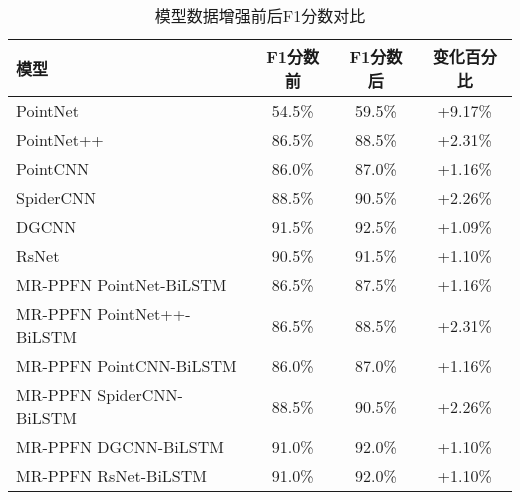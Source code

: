 \begin{table}[htbp]
    \begin{subtable}{\linewidth}
        \centering
        \caption{模型数据增强前后F1分数对比}
        \begin{tabular}{lccc}
            \toprule
            \textbf{模型} & \textbf{F1分数前} & \textbf{F1分数后} & \textbf{变化百分比} \\
            \midrule
            PointNet & 54.5\% & 59.5\% & +9.17\% \\
            PointNet++ & 86.5\% & 88.5\% & +2.31\% \\
            PointCNN & 86.0\% & 87.0\% & +1.16\% \\
            SpiderCNN & 88.5\% & 90.5\% & +2.26\% \\
            DGCNN & 91.5\% & 92.5\% & +1.09\% \\
            RsNet & 90.5\% & 91.5\% & +1.10\% \\
            MR-PPFN PointNet-BiLSTM & 86.5\% & 87.5\% & +1.16\% \\
            MR-PPFN PointNet++-BiLSTM & 86.5\% & 88.5\% & +2.31\% \\
            MR-PPFN PointCNN-BiLSTM & 86.0\% & 87.0\% & +1.16\% \\
            MR-PPFN SpiderCNN-BiLSTM & 88.5\% & 90.5\% & +2.26\% \\
            MR-PPFN DGCNN-BiLSTM & 91.0\% & 92.0\% & +1.10\% \\
            MR-PPFN RsNet-BiLSTM & 91.0\% & 92.0\% & +1.10\% \\
            \bottomrule
        \end{tabular}
        \label{tab:f1-comparison}
    \end{subtable}
\end{table}
 


